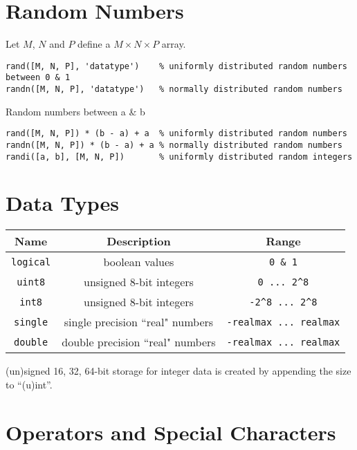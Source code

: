 \documentclass{article}
\begin{document}
\lstset{language=Matlab, upquote=true}

\section*{Random Numbers}
Let $M$, $N$ and $P$ define a $M\times N\times P$ array.
\begin{lstlisting}
rand([M, N, P], 'datatype')    % uniformly distributed random numbers between 0 & 1
randn([M, N, P], 'datatype')   % normally distributed random numbers
\end{lstlisting}
Random numbers between a \& b
\begin{lstlisting}
rand([M, N, P]) * (b - a) + a  % uniformly distributed random numbers
randn([M, N, P]) * (b - a) + a % normally distributed random numbers
randi([a, b], [M, N, P])       % uniformly distributed random integers
\end{lstlisting}
\section*{Data Types}
\begin{table}[H]
    \centering
    \begin{tabular}{c | c | c}
        \toprule
        \textbf{Name} & \textbf{Description} & \textbf{Range} \\
        \midrule
        \lstinline!logical! & boolean values                   & \lstinline!0 & 1! \\
        \lstinline!uint8!   & unsigned 8-bit integers          & \lstinline!0 ... 2^8! \\
        \lstinline!int8!    & unsigned 8-bit integers          & \lstinline!-2^8 ... 2^8! \\
        \lstinline!single!  & single precision ``real" numbers & \lstinline!-realmax ... realmax! \\
        \lstinline!double!  & double precision ``real" numbers & \lstinline!-realmax ... realmax! \\
        \bottomrule
    \end{tabular}
\end{table}
(un)signed 16, 32, 64-bit storage for integer data is created by appending the size to ``(u)int''.
\section*{Operators and Special Characters}
\end{document}
